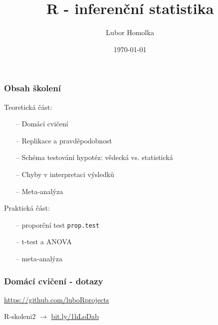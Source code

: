 \documentclass[10pt,xcolor={dvipsnames}]{beamer}
\begin{document}
\title{\textsf{R} - inferenční statistika}
\author{Lubor Homolka}
\date{\today}
\begin{frame}
\titlepage
\end{frame}


\begin{frame}
\frametitle{Obsah školení}
\begin{large}
Teoretická část:\\
\begin{itemize}
\item[--] Domácí cvičení  \\[0.3cm]
\item[--] Replikace a pravděpodobnost \\[0.3cm]
\item[--] Schéma testování hypotéz: vědecká vs. statistická \\[0.3cm]
\item[--] Chyby v interpretaci výsledků \\[0.3cm]
\item[--] Meta-analýza \\[0.5cm]
\end{itemize}
Praktická část:\\
\begin{itemize}
\item[--] proporční test \texttt{prop.test} \\[0.3cm]
\item[--] t-test a ANOVA \\[0.3cm]
\item[--] meta-analýza
\end{itemize}
\end{large}
\end{frame}

\begin{frame}
\frametitle{Domácí cvičení - dotazy}\begin{large}
\begin{center}
\url{https://github.com/luboRprojects}\newline\bigskip
	
\hspace*{-0.6cm}R-skoleni2 \hspace*{0.5cm}$\rightarrow$ \url{bit.ly/1hLoDab}
\end{center}
\end{large}
\end{frame}

\end{document}
